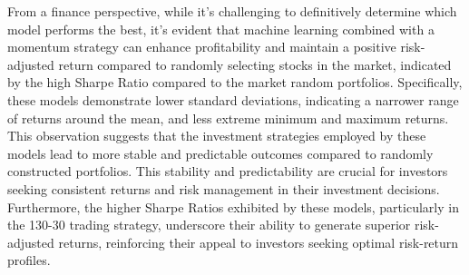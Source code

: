 \documentclass{article}
\begin{document}
From a finance perspective, while it's challenging to definitively determine which model performs the best, it's evident that machine learning combined with a momentum strategy can enhance profitability and maintain a positive risk-adjusted return compared to randomly selecting stocks in the market, indicated by the high Sharpe Ratio compared to the market random portfolios. Specifically, these models demonstrate lower standard deviations, indicating a narrower range of returns around the mean, and less extreme minimum and maximum returns. This observation suggests that the investment strategies employed by these models lead to more stable and predictable outcomes compared to randomly constructed portfolios. This stability and predictability are crucial for investors seeking consistent returns and risk management in their investment decisions. Furthermore, the higher Sharpe Ratios exhibited by these models, particularly in the 130-30 trading strategy, underscore their ability to generate superior risk-adjusted returns, reinforcing their appeal to investors seeking optimal risk-return profiles.
\end{document}
